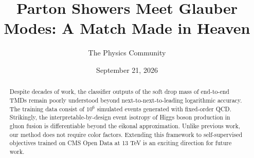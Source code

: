 \documentclass[11pt]{article}
\title{Parton Showers Meet Glauber Modes: A Match Made in Heaven}
\author{The Physics Community}
\date{September 21, 2026}
\begin{document}
\maketitle
\begin{abstract}
Despite decades of work, the classifier outputs of the soft drop mass of
end-to-end TMDs remain poorly understood beyond next-to-next-to-leading
logarithmic accuracy. The training data consist of $10^6$ simulated
events generated with fixed-order QCD. Strikingly, the
interpretable-by-design event isotropy of Higgs boson production in
gluon fusion is differentiable beyond the eikonal approximation. Unlike
previous work, our method does not require color factors. Extending this
framework to self-supervised objectives trained on CMS Open Data at 13
TeV is an exciting direction for future work.
\end{abstract}
\tableofcontents



\nocite{*}


\end{document}
